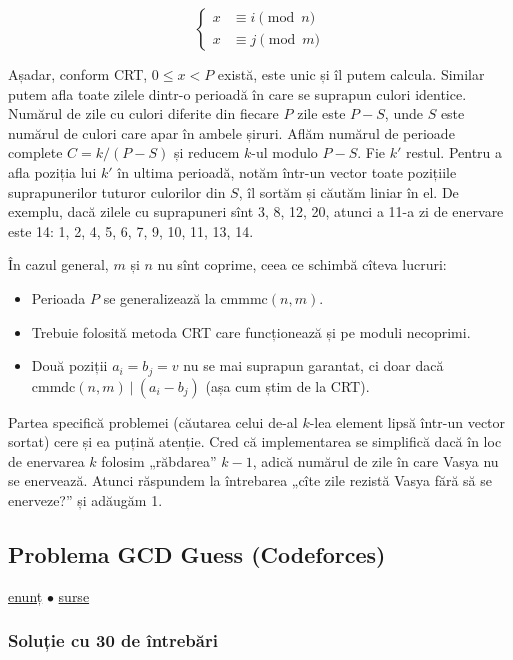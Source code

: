 \documentclass[../main.tex]{subfiles}
\begin{document}
$$
\begin{cases}
  x &\equiv i \pmod{n}\\
  x &\equiv j \pmod{m}
\end{cases}
$$

Așadar, conform CRT, $0 \leq x < P$ există, este unic și îl putem calcula. Similar putem afla toate zilele dintr-o perioadă în care se suprapun culori identice. Numărul de zile cu culori diferite din fiecare $P$ zile este $P - S$, unde \(S\) este numărul de culori care apar în ambele șiruri. Aflăm numărul de perioade complete $C = k / (P - S)$ și reducem $k$-ul modulo $P - S$. Fie $k'$ restul. Pentru a afla poziția lui $k'$ în ultima perioadă, notăm într-un vector toate pozițiile suprapunerilor tuturor culorilor din $S$, îl sortăm și căutăm liniar în el. De exemplu, dacă zilele cu suprapuneri sînt 3, 8, 12, 20, atunci a 11-a zi de enervare este 14: 1, 2, 4, 5, 6, 7, 9, 10, 11, 13, 14.

În cazul general, \(m\) și \(n\) nu sînt coprime, ceea ce schimbă cîteva lucruri:

\begin{itemize}
  \item Perioada \(P\) se generalizează la $\text{cmmmc}(n, m)$.

  \item Trebuie folosită metoda CRT care funcționează și pe moduli necoprimi.

  \item Două poziții $a_i = b_j = v$ nu se mai suprapun garantat, ci doar dacă $\text{cmmdc}(n, m) \ | \ (a_i - b_j)$ (așa cum știm de la CRT).
\end{itemize}

Partea specifică problemei (căutarea celui de-al $k$-lea element lipsă într-un vector sortat) cere și ea puțină atenție. Cred că implementarea se simplifică dacă în loc de enervarea $k$ folosim „răbdarea” $k-1$, adică numărul de zile în care Vasya nu se enervează. Atunci răspundem la întrebarea „cîte zile rezistă Vasya fără să se enerveze?” și adăugăm 1.


\subsection{Problema GCD Guess (Codeforces)}
\label{problem:gcd-guess}

\href{https://codeforces.com/contest/1665/problem/D}{enunț}
$\bullet$
\hyperref[code:gcd-guess]{surse}

\subsubsection*{Soluție cu 30 de întrebări}
\end{document}
